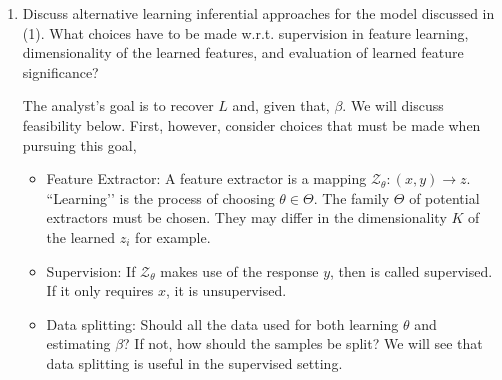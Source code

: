 \documentclass[]{article}
\begin{document}
\begin{enumerate}
\item Discuss alternative learning inferential approaches for the model
discussed in (1). What choices have to be made w.r.t. supervision in feature
learning, dimensionality of the learned features, and evaluation of learned
feature significance?

The analyst’s goal is to recover $L$ and, given that, $\beta$. We will discuss
feasibility below. First, however, consider choices that must be made when
pursuing this goal,
\begin{itemize}
\item Feature Extractor: A feature extractor is a mapping $\mathcal{Z}_{\theta}:
\left(x, y\right) \to z$. ``Learning’’ is the process of choosing $\theta \in
\Theta$. The family $\Theta$ of potential extractors must be chosen. They may
differ in the dimensionality $K$ of the learned $z_i$ for example.
\item Supervision: If $\mathcal{Z}_{\theta}$ makes use of the response $y$, then
is called supervised. If it only requires $x$, it is unsupervised.
\item Data splitting: Should all the data used for both learning $\theta$ and
estimating $\beta$? If not, how should the samples be split? We will see that
data splitting is useful in the supervised setting.
\end{itemize}

\end{enumerate}
\end{document}
